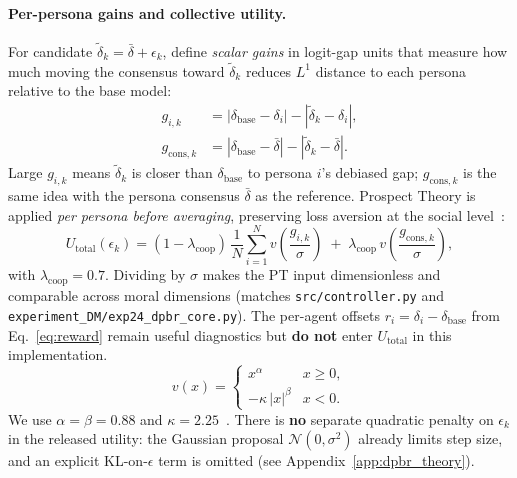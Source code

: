 \documentclass{article}
\begin{document}
\paragraph{Per-persona gains and collective utility.}
For candidate $\tilde{\delta}_k = \bar{\delta} + \epsilon_k$, define
\emph{scalar gains} in logit-gap units that measure how much moving the
consensus toward $\tilde{\delta}_k$ reduces $L^1$ distance to each persona
relative to the base model:
\begin{align}
  g_{i,k} &= |\delta_{\text{base}} - \delta_i| - |\tilde{\delta}_k - \delta_i|,
  \label{eq:g_per_agent} \\
  g_{\text{cons},k} &= |\delta_{\text{base}} - \bar{\delta}| - |\tilde{\delta}_k - \bar{\delta}|.
  \label{eq:g_cons}
\end{align}
Large $g_{i,k}$ means $\tilde{\delta}_k$ is closer than $\delta_{\text{base}}$
to persona $i$'s debiased gap; $g_{\text{cons},k}$ is the same idea with the
persona consensus $\bar{\delta}$ as the reference. Prospect Theory is applied
\emph{per persona before averaging}, preserving loss aversion at the social
level~\citep{kahneman1979prospect}:
\begin{equation}
  U_{\text{total}}(\epsilon_k)
  = (1 - \lambda_{\text{coop}})\,\frac{1}{N}\sum_{i=1}^{N}
      v\!\left(\frac{g_{i,k}}{\sigma}\right)
  \;+\; \lambda_{\text{coop}}\,
      v\!\left(\frac{g_{\text{cons},k}}{\sigma}\right),
  \label{eq:util_total}
\end{equation}
with $\lambda_{\text{coop}}=0.7$. Dividing by $\sigma$ makes the PT input
dimensionless and comparable across moral dimensions (matches
\texttt{src/controller.py} and \texttt{experiment\_DM/exp24\_dpbr\_core.py}).
The per-agent offsets $r_i = \delta_i - \delta_{\text{base}}$ from
Eq.~\ref{eq:reward} remain useful diagnostics but \textbf{do not} enter
$U_{\text{total}}$ in this implementation.
\begin{equation}
  v(x) = \begin{cases}
    x^{\alpha} & x \geq 0,\\
    -\kappa\,|x|^{\beta} & x < 0.
  \end{cases}
  \label{eq:prospect}
\end{equation}
We use $\alpha=\beta=0.88$ and $\kappa=2.25$~\citep{kahneman1979prospect}.
There is \textbf{no} separate quadratic penalty on $\epsilon_k$ in the
released utility: the Gaussian proposal $\mathcal{N}(0,\sigma^2)$ already
limits step size, and an explicit KL-on-$\epsilon$ term is omitted (see
Appendix~\ref{app:dpbr_theory}).
\end{document}
